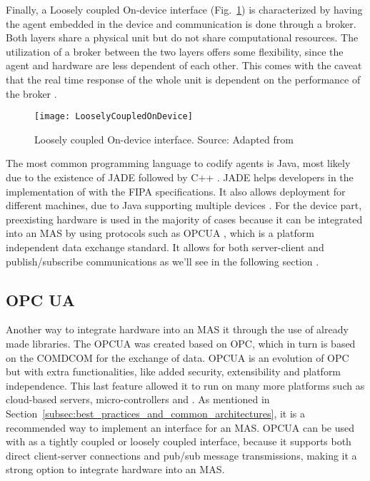 Finally, a Loosely coupled On-device interface (Fig.~\ref{fig:loosely_coupled_ondevice}) is characterized by having the agent embedded in the device and communication is done through a broker. Both layers share a physical unit but do not share computational resources. The utilization of a broker between the two layers offers some flexibility, since the agent and hardware are less dependent of each other. This comes with the caveat that the real time response of the whole unit is dependent on the performance of the broker \cite{8591641}.\\

\begin{figure}[]
	\centering
	\texttt{[image: LooselyCoupledOnDevice]}
	\caption{Loosely coupled On-device interface. Source: Adapted from \cite{8591641}}
	\label{fig:loosely_coupled_ondevice}
\end{figure}

The most common programming language to codify agents is Java, most likely due to the existence of  \acrshort{JADE} followed by C++ \cite{8591641}. \acrshort{JADE} helps developers in the implementation of  with the \acrshort{FIPA} specifications. It also allows deployment for different machines, due to Java supporting multiple devices \cite{JADE_website}.
For the device part, preexisting hardware is used in the majority of cases because it can be integrated into an \acrshort{MAS} by using protocols such as \acrshort{OPCUA} \cite{8591641}, which is a platform independent data exchange standard. It allows for both server-client and publish/subscribe communications as we'll see in the following section \cite{OPCUA_website}.

\subsection{OPC UA}
\label{subsec:opcua}


Another way to integrate hardware into an \acrshort{MAS} it through the use of already made libraries. The \acrfull{OPCUA} was created based on \acrfull{OPC}, which in turn is based on the \acrshort{COMDCOM} for the exchange of data. \acrshort{OPCUA} is an evolution of \acrshort{OPC} but with extra functionalities, like added security, extensibility and platform independence. This last feature allowed it to run on many more platforms such as cloud-based servers, micro-controllers and  \cite{OPCUA_website}. As mentioned in Section~\ref{subsec:best_practices_and_common_architectures}, it is a recommended way to implement an interface for an \acrshort{MAS}. \acrshort{OPCUA} can be used with as a tightly coupled or loosely coupled interface, because it supports both direct client-server connections and pub/sub message transmissions, making it a strong option to integrate hardware into an \acrshort{MAS}.\\

